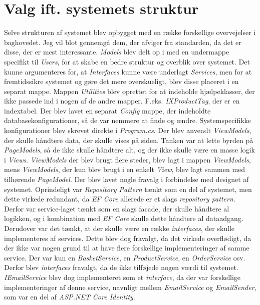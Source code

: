 \section{Valg ift. systemets struktur}
\label{sec:valg-struktur}
Selve strukturen af systemet blev opbygget med en række forskellige overvejelser i baghovedet. Jeg vil blot gennemgå dem, der afviger fra standarden, da det er disse, der er mest interessante.
\emph{Models} blev delt op i med en undermappe specifikt til \emph{Users}, for at skabe en bedre struktur og overblik over systemet.
Det kunne argumenteres for, at \emph{Interfaces} kunne være underlagt \emph{Services}, men for at fremtidssikre systemet og gøre det mere overskueligt, blev disse placeret i en separat mappe.
Mappen \emph{Utilities} blev oprettet for at indeholde hjælpeklasser, der ikke passede ind i nogen af de andre mapper. F.eks. \emph{IXProductTag}, der er en indextabel.
Der blev lavet en separat \emph{Config} mappe, der indeholdte databasekonfigurationer, så de var nemmere at finde og ændre.
Systemspecifikke konfigurationer blev skrevet direkte i \emph{Program.cs}.
Der blev anvendt \emph{ViewModels}, der skulle håndtere data, der skulle vises på siden. Tanken var at lette byrden på \emph{PageModels}, så de ikke skulle håndtere alt, og der ikke skulle være en masse logik i \emph{Views}.
\emph{ViewModels} der blev brugt flere steder, blev lagt i mappen \emph{ViewModels}, mens \emph{ViewModels}, der kun blev brugt i en enkelt \emph{View}, blev lagt sammen med tilhørende \emph{PageModel}.
Der blev lavet nogle fravalg i forbindelse med designet af systemet. Oprindeligt var \emph{Repository Pattern} tænkt som en del af systemet, men dette virkede redundant, da \emph{EF Core} allerede er et slags \emph{repository pattern}.
Derfor var service-laget tænkt som en slags facade, der skulle håndtere al logikken, og i kombination med \emph{EF Core} skulle dette håndtere al dataadgang.
Derudover var det tænkt, at der skulle være en række \emph{interfaces}, der skulle implementeres af services. Dette blev dog fravalgt, da det virkede overflødigt, da der ikke var nogen grund til at have flere forskellige implementeringer af samme service.
Der var kun en \emph{BasketService}, en \emph{ProductService}, en \emph{OrderService} osv. Derfor blev \emph{interfaces} fravalgt, da de ikke tilføjede nogen værdi til systemet.
\emph{IEmailService} blev dog implementeret som et \emph{interface}, da der var forskellige implementeringer af denne service, navnligt mellem \emph{EmailService} og \emph{EmailSender}, som var en del af \emph{ASP.NET Core Identity}.

